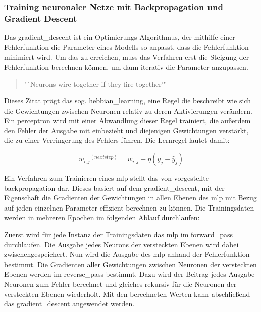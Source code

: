 \subsubsection{Training neuronaler Netze mit Backpropagation und Gradient Descent}

Das \gls{gradient_descent} ist ein Optimierungs-Algorithmus, der mithilfe einer Fehlerfunktion die Parameter eines Modells so anpasst, dass die Fehlerfunktion minimiert wird. Um das zu erreichen, muss das Verfahren erst die Steigung der Fehlerfunktion berechnen können, um dann iterativ die Parameter anzupassen. \cite[vgl. S. 118]{Geron2019}

\begin{quote}
  "`Neurons wire together if they fire together'" \cite{Lowel1992}
\end{quote}

Dieses Zitat prägt das sog. \gls{hebbian_learning}, eine Regel die beschreibt wie sich die Gewichtungen zwischen Neuronen relativ zu deren Aktivierungen verändern. Ein \gls{perceptron} wird mit einer Abwandlung dieser Regel trainiert, die außerdem den Fehler der Ausgabe mit einbezieht und diejenigen Gewichtungen verstärkt, die zu einer Verringerung des Fehlers führen. \cite[vgl. S. 289 ff.]{Geron2019} Die Lernregel lautet damit:

\[{w_{i,j}}^{(next step)}=w_{i,j}+\eta(y_j-\hat{y}_j)\]

Ein Verfahren zum Trainieren eines \gls{mlp} stellt das von \cite{Rumelhart1986} vorgestellte \gls{backpropagation} dar. Dieses basiert auf dem \gls{gradient_descent}, mit der Eigenschaft die Gradienten der Gewichtungen in allen Ebenen des \gls{mlp} mit Bezug auf jeden einzelnen Parameter effizient berechnen zu können. Die Trainingsdaten werden in mehreren Epochen im folgenden Ablauf durchlaufen:

Zuerst wird für jede Instanz der Trainingsdaten das \gls{mlp} im \gls{forward_pass} durchlaufen. Die Ausgabe jedes Neurons der versteckten Ebenen wird dabei zwischengespeichert. Nun wird die Ausgabe des \gls{mlp} anhand der Fehlerfunktion bestimmt. Die Gradienten aller Gewichtungen zwischen Neuronen der versteckten Ebenen werden im \gls{reverse_pass} bestimmt. Dazu wird der Beitrag jedes Ausgabe-Neuronen zum Fehler berechnet und gleiches rekursiv für die Neuronen der versteckten Ebenen wiederholt. Mit den berechneten Werten kann abschließend das \gls{gradient_descent} angewendet werden. \cite[S. 286]{Geron2019}
